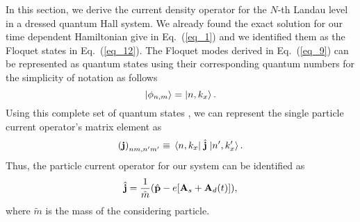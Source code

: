 In this section, we derive the current density operator for the $N$-th Landau level in a dressed quantum Hall system. We already found the exact solution for our time dependent Hamiltonian give in Eq.~(\ref{eq_1}) and we identified them as the Floquet states in Eq.~(\ref{eq_12}). The Floquet modes derived in Eq.~(\ref{eq_9}) can be represented as quantum states using their corresponding quantum numbers for the simplicity of notation as follows
\begin{equation} \label{eq_d1}
  \ket{\phi_{n,m}} = \ket{n,k_x}.
\end{equation}
Using this complete set of quantum states \cite{wackerl20,holthaus15,grifoni98}, we can represent the single particle current operator's matrix element as
\begin{equation} \label{eq_d2}
  \qty(\vb{j})_{nm,n'm'} \equiv \mel{n,k_x}{\;\hat{\vb{j}}\;}{n',k'_x}.
\end{equation}
Thus, the particle current operator for our system \cite{mahan00,bruus04} can be identified as
\begin{equation} \label{eq_d3}
  \hat{\vb{j}} = \frac{1}{\tilde{m}} \qty(\hat{\vb{p}} - e\qty[\vb{A}_s + \vb{A}_d(t)]),
\end{equation}
where $\tilde{m}$ is the mass of the considering particle.

